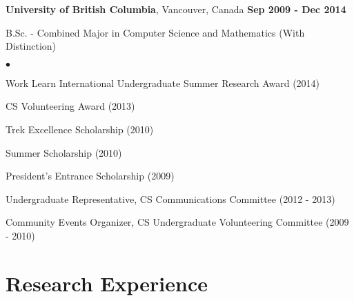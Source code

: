 \documentclass[margin,line]{res}
\newenvironment{list1}{
  \begin{list}{\ding{113}}{
      \setlength{\itemsep}{0in}
      \setlength{\parsep}{0in} \setlength{\parskip}{0in}
      \setlength{\topsep}{0in} \setlength{\partopsep}{0in} 
      \setlength{\leftmargin}{0.17in}}}{\end{list}}
\newenvironment{list2}{
  \begin{list}{$\bullet$}{
      \setlength{\itemsep}{0in}
      \setlength{\parsep}{0in} \setlength{\parskip}{0in}
      \setlength{\topsep}{0in} \setlength{\partopsep}{0in} 
      \setlength{\leftmargin}{0.2in}}}{\end{list}}
\newenvironment{list3}{
  \begin{list}{\textopenbullet}{
      \setlength{\itemsep}{0in}
      \setlength{\parsep}{0in} \setlength{\parskip}{0in}
      \setlength{\topsep}{0in} \setlength{\partopsep}{0in} 
      \setlength{\leftmargin}{0.1in}}}{\end{list}}
\begin{document}
\begin{resume}
{\bf University of British Columbia}, Vancouver, Canada  \hfill {\bf Sep 2009 - Dec 2014}\\
\vspace*{-.2cm}
\begin{list1}
\item[] B.Sc. - Combined Major in Computer Science and Mathematics (With Distinction)
\begin{list2}
\vspace*{.1cm}
\setlength\itemsep{0.25em}
\item Work Learn International Undergraduate Summer Research Award (2014)
\item CS Volunteering Award (2013)
\item Trek Excellence Scholarship (2010)
\item Summer Scholarship (2010)
\item President's Entrance Scholarship (2009)
\begin{list3}
\vspace*{.1cm}
\setlength\itemsep{0.25em}
\item Undergraduate Representative, CS Communications Committee (2012 - 2013)
\item Community Events Organizer, CS Undergraduate Volunteering Committee (2009 - 2010)
\end{list3}
\end{list2}
\end{list1}

\vspace*{.4cm}

\section{\sc Research Experience}


\end{resume}
\end{document}
